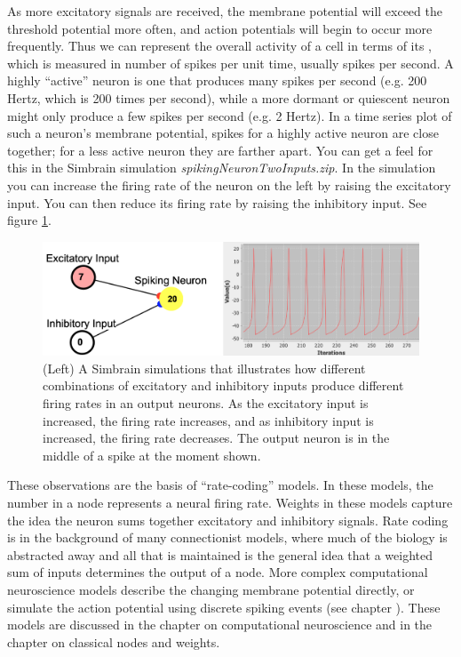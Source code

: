As more excitatory signals are received, the membrane potential will exceed the threshold potential more often, and action potentials will begin to occur more frequently. Thus we can represent the overall activity of a cell in terms of its , which is measured in number of spikes per unit time, usually spikes per second. A highly ``active'' neuron is one that produces many spikes per second (e.g. 200 Hertz, which is 200 times per second), while a more dormant or quiescent neuron might only produce a few spikes per second (e.g. 2 Hertz). In a time series plot of such a neuron's membrane potential, spikes for a highly active neuron are close together; for a less active neuron they are farther apart. You can get a feel for this in the Simbrain simulation  \emph{spikingNeuronTwoInputs.zip}. In the simulation you can increase the firing rate of the neuron on the left by raising the excitatory input. You can then reduce its firing rate by raising the inhibitory input. See figure \ref{twoNeuronsSpiking}.
  
 \begin{figure}[h]
\centering
\includegraphics[scale=.4]{./images/TwoNeuronsSpiking.png}
\caption[Jeff Yoshimi.]{(Left) A Simbrain simulations that illustrates how different combinations of excitatory and inhibitory inputs produce different firing rates in an output neurons. As the excitatory input is increased, the firing rate increases, and as inhibitory input is increased, the firing rate decreases. The output neuron is in the middle of a spike at the moment shown. }
\label{twoNeuronsSpiking}
\end{figure}

These observations are the basis of ``rate-coding'' models. In these models, the number in a node represents a neural firing rate. Weights in these models capture the idea the neuron sums together excitatory and inhibitory signals. Rate coding is in the background of many connectionist models, where much of the biology is abstracted away and all that is maintained is the general idea that a weighted sum of inputs determines the output of a node.  More complex computational neuroscience models describe the changing membrane potential directly, or simulate the action potential using discrete spiking events (see chapter ). These models are discussed in the chapter on computational neuroscience and in the chapter on classical nodes and weights.

